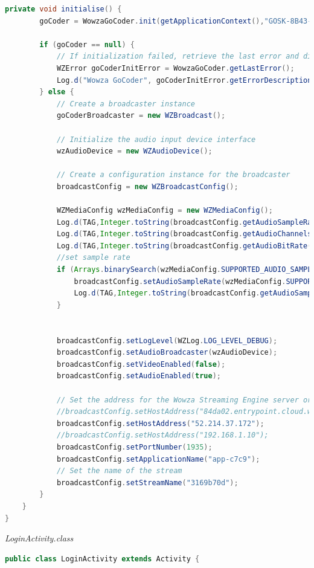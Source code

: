 \documentclass{article}
\begin{document}
\begin{landscape}
\begin{lstlisting}[language=Java,basicstyle=\tiny]
    private void initialise() {
        goCoder = WowzaGoCoder.init(getApplicationContext(),"GOSK-8B43-0103-D04D-2E8A-BC61");

        if (goCoder == null) {
            // If initialization failed, retrieve the last error and display it
            WZError goCoderInitError = WowzaGoCoder.getLastError();
            Log.d("Wowza GoCoder", goCoderInitError.getErrorDescription());
        } else {
            // Create a broadcaster instance
            goCoderBroadcaster = new WZBroadcast();

            // Initialize the audio input device interface
            wzAudioDevice = new WZAudioDevice();

            // Create a configuration instance for the broadcaster
            broadcastConfig = new WZBroadcastConfig();

            WZMediaConfig wzMediaConfig = new WZMediaConfig();
            Log.d(TAG,Integer.toString(broadcastConfig.getAudioSampleRate()));
            Log.d(TAG,Integer.toString(broadcastConfig.getAudioChannels()));
            Log.d(TAG,Integer.toString(broadcastConfig.getAudioBitRate()));
            //set sample rate
            if (Arrays.binarySearch(wzMediaConfig.SUPPORTED_AUDIO_SAMPLE_RATES,wzMediaConfig.DEFAULT_AUDIO_SAMPLE_RATE) < 0) {
                broadcastConfig.setAudioSampleRate(wzMediaConfig.SUPPORTED_AUDIO_SAMPLE_RATES[wzMediaConfig.SUPPORTED_AUDIO_SAMPLE_RATES.length - 1]);
                Log.d(TAG,Integer.toString(broadcastConfig.getAudioSampleRate()));
            }


            broadcastConfig.setLogLevel(WZLog.LOG_LEVEL_DEBUG);
            broadcastConfig.setAudioBroadcaster(wzAudioDevice);
            broadcastConfig.setVideoEnabled(false);
            broadcastConfig.setAudioEnabled(true);

            // Set the address for the Wowza Streaming Engine server or Wowza Cloud
            //broadcastConfig.setHostAddress("84da02.entrypoint.cloud.wowza.com/app-c7c9");
            broadcastConfig.setHostAddress("52.214.37.172");
            //broadcastConfig.setHostAddress("192.168.1.10");
            broadcastConfig.setPortNumber(1935);
            broadcastConfig.setApplicationName("app-c7c9");
            // Set the name of the stream
            broadcastConfig.setStreamName("3169b70d");
        }
    }
}
\end{lstlisting}
{\large \textit{LoginActivity.class}}
\begin{lstlisting}[language=Java,basicstyle=\tiny]
public class LoginActivity extends Activity {


\end{lstlisting}
\end{landscape}
\end{document}
